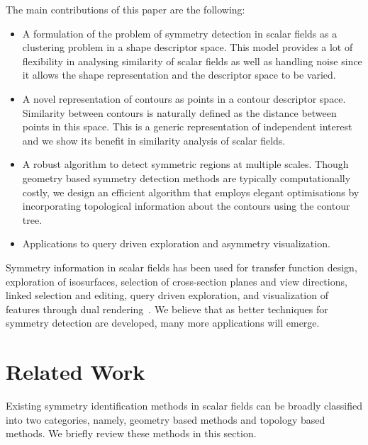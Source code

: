 \documentclass[review,journal]{vgtc}         %
\begin{document}
The main contributions of this paper are the following:
\begin{itemize}[itemsep=0mm]
\item A formulation of the problem of symmetry detection in scalar fields
as a clustering problem in a shape descriptor space. This model
provides a lot of flexibility in analysing similarity of scalar fields
as well as handling noise since it allows the shape representation and the 
descriptor space to be varied.
\item A novel representation of contours as points in a contour descriptor space.
Similarity between contours is naturally defined as the distance between points 
in this space. This is a generic representation of independent interest 
and we show its benefit in similarity analysis of scalar fields.
\item A robust algorithm to detect symmetric regions at multiple scales. Though geometry based 
symmetry detection methods are typically computationally costly, we design an efficient algorithm 
that employs elegant optimisations by incorporating topological information 
about the contours using the contour tree.
\item Applications to query driven exploration and asymmetry visualization.
\end{itemize}
Symmetry information in scalar fields
has been used for transfer function design, exploration of isosurfaces, selection of cross-section
planes and view directions, linked selection and editing, query driven exploration,
and visualization of features through dual rendering~\cite{ThomN11,HongS08,ThomN13,MasoodTN13}.
We believe that as better techniques for symmetry detection are developed,
many more applications will emerge.
\section{Related Work}
Existing symmetry identification methods in scalar fields can be broadly classified into two
categories, namely, geometry based methods and topology based methods. We briefly review
these methods in this section.
\end{document}
